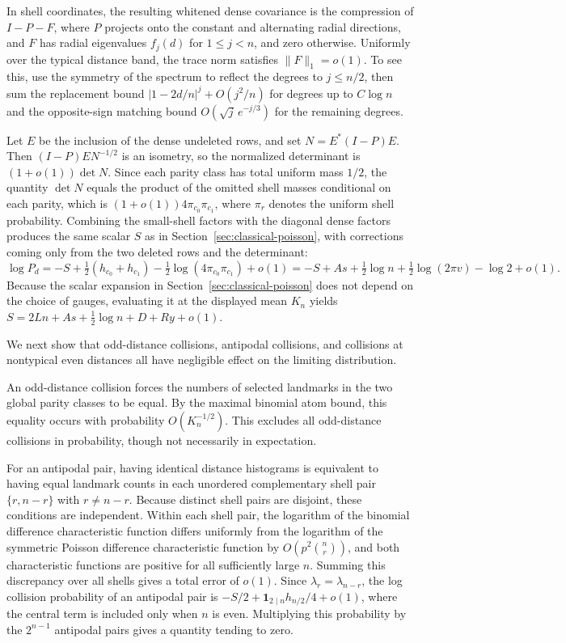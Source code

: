 In shell coordinates, the resulting whitened dense covariance is the compression of \(I-P-F\), where \(P\) projects onto the constant and alternating radial directions, and \(F\) has radial eigenvalues \(f_j(d)\) for \(1\le j<n\), and zero otherwise. Uniformly over the typical distance band, the trace norm satisfies \(\|F\|_1=o(1)\). To see this, use the symmetry of the spectrum to reflect the degrees to \(j\le n/2\), then sum the replacement bound \(|1-2d/n|^j+O(j^2/n)\) for degrees up to \(C\log n\) and the opposite-sign matching bound \(O(\sqrt j\,e^{-j/3})\) for the remaining degrees.

Let \(E\) be the inclusion of the dense undeleted rows, and set \(N=E^*(I-P)E\). Then \((I-P)EN^{-1/2}\) is an isometry, so the normalized determinant is \((1+o(1))\det N\). Since each parity class has total uniform mass \(1/2\), the quantity \(\det N\) equals the product of the omitted shell masses conditional on each parity, which is \((1+o(1))4\pi_{c_0}\pi_{c_1}\), where \(\pi_r\) denotes the uniform shell probability. Combining the small-shell factors with the diagonal dense factors produces the same scalar \(S\) as in Section~\ref{sec:classical-poisson}, with corrections coming only from the two deleted rows and the determinant:
\[
 \log P_d=-S+\tfrac12(h_{c_0}+h_{c_1})
             -\tfrac12\log(4\pi_{c_0}\pi_{c_1})+o(1)
         =-S+As+\tfrac12\log n+\tfrac12\log(2\pi v)-\log 2+o(1).
\]
Because the scalar expansion in Section~\ref{sec:classical-poisson} does not depend on the choice of gauges, evaluating it at the displayed mean \(K_n\) yields \(S=2Ln+As+\tfrac12\log n+D+Ry+o(1)\).

We next show that odd-distance collisions, antipodal collisions, and collisions at nontypical even distances all have negligible effect on the limiting distribution.

An odd-distance collision forces the numbers of selected landmarks in the two global parity classes to be equal. By the maximal binomial atom bound, this equality occurs with probability \(O(K_n^{-1/2})\). This excludes all odd-distance collisions in probability, though not necessarily in expectation.

For an antipodal pair, having identical distance histograms is equivalent to having equal landmark counts in each unordered complementary shell pair \(\{r,n-r\}\) with \(r\ne n-r\). Because distinct shell pairs are disjoint, these conditions are independent. Within each shell pair, the logarithm of the binomial difference characteristic function differs uniformly from the logarithm of the symmetric Poisson difference characteristic function by \(O(p^2\binom nr)\), and both characteristic functions are positive for all sufficiently large \(n\). Summing this discrepancy over all shells gives a total error of \(o(1)\). Since \(\lambda_r=\lambda_{n-r}\), the log collision probability of an antipodal pair is \(-S/2+\mathbf 1_{2\mid n}h_{n/2}/4+o(1)\), where the central term is included only when \(n\) is even. Multiplying this probability by the \(2^{n-1}\) antipodal pairs gives a quantity tending to zero.

